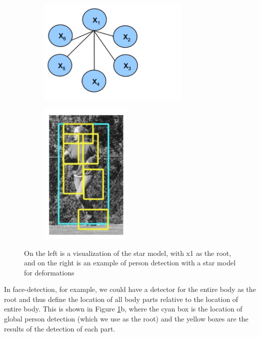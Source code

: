 \documentclass{article}
\begin{document}
\begin{figure}[h]
	\centering
	\begin{subfigure}{0.48\textwidth}
        \includegraphics[width=0.8\textwidth]{star.png}
        \caption{}
    \end{subfigure}
    \hspace*{\fill} %
    \begin{subfigure}{0.48\textwidth}
        \includegraphics[width=0.48\textwidth]{person_star.png}
        \caption{}
    \end{subfigure}
    \caption{On the left is a visualization of the star model, with x1 as the root,
    and on the right is an example of person detection with a star model for 
    deformations}
    \label{fig:star_model}
\end{figure}

In face-detection, for example, we could have a detector for
the entire body as the root and thus define the location of all body parts relative
to the location of entire body. This is shown in Figure \ref{fig:star_model}b,
where the cyan box is the location of global person detection (which we use as the 
root) and the yellow boxes are the results of the detection of each part.\\
\end{document}
